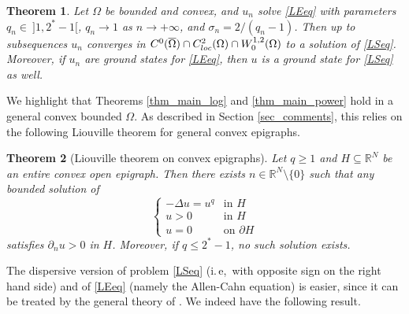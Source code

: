 \documentclass[12pt]{amsart}
\numberwithin{equation}{section}
\newtheorem{theorem}{Theorem}[section]
\theoremstyle{plain}
\theoremstyle{plain}
\theoremstyle{plain}
\theoremstyle{definition}
\newcommand{\R}{{\mathbb R}}
\newcommand{\beq}{\begin{equation}}
\newcommand{\eeq}{\end{equation}}
\renewcommand{\le}{\leqslant}
\renewcommand{\ge}{\geqslant}
\begin{document}
\begin{theorem}
\label{thm_convergence}
Let $\Omega$ be bounded and convex, and $u_n$ solve \eqref{LEeq} with parameters $q_n \in \ ]1, 2^*-1[$, $q_n \to 1$ as $n \to +\infty$, and $\sigma_n = 2/(q_n-1)$. 
Then up to subsequences $u_n$ converges in $C^0(\overline{\Omega})\cap C^2_{\rm loc}(\Omega)\cap W^{1,2}_0(\Omega)$ to a solution of \eqref{LSeq}. 
Moreover, if $u_n$ are ground states for \eqref{LEeq}, then $u$ is a ground state for \eqref{LSeq} as well.
\end{theorem}

We highlight that Theorems \ref{thm_main_log} and \ref{thm_main_power} hold in a general convex bounded $\Omega$. 
As described in Section \ref{sec_comments}, this relies on the following Liouville theorem for general convex epigraphs. 
 
\begin{theorem}[Liouville theorem on convex epigraphs]
\label{thm_main_liouville}
Let $q\ge 1$ and $H 
\subseteq \R^N$ be an entire convex open epigraph. 
Then there exists $n\in \R^N\setminus\{0\}$ such that any bounded solution of
\beq
\label{Linp}
\begin{cases}
-\Delta u= u^q&\text{in $H$}\\
u>0&\text{in $H $}\\
u=0&\text{on $\partial H$}
\end{cases}
\eeq
 satisfies $\partial_n u>0$ in $H$. Moreover, if $q\le 2^*-1$, no such solution exists.
\end{theorem}

The dispersive version of problem \eqref{LSeq} (i.\,e,\, with opposite sign on the right hand side) and of \eqref{LEeq} (namely the Allen-Cahn equation) is easier, since it can be treated by the general theory of \cite{BMS22, MRS24}. 
We indeed have the following result.
\end{document}
